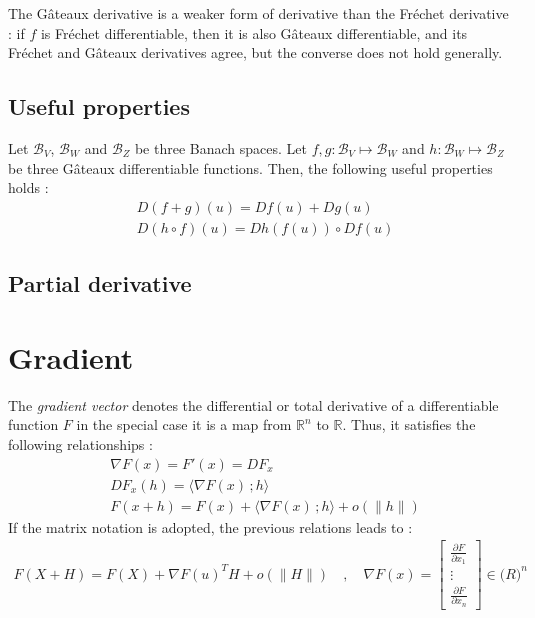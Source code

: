 The Gâteaux derivative is a weaker form of derivative than the Fréchet derivative : if $f$ is Fréchet differentiable, then it is also Gâteaux differentiable, and its Fréchet and Gâteaux derivatives agree, but the converse does not hold generally.

\subsection{Useful properties}

Let $\mathcal{B}_V$, $\mathcal{B}_W$ and $\mathcal{B}_Z$ be three Banach spaces. 
Let $f,g : \mathcal{B}_V \longmapsto \mathcal{B}_W$ and $h : \mathcal{B}_W \longmapsto \mathcal{B}_Z$ be three Gâteaux differentiable functions. Then, the following useful properties holds :
\begin{align}
	&D(f+g)(u) = Df(u) + Dg(u)\\
	&D(h\circ f)(u) = Dh(f(u)) \circ Df(u)
\end{align}

\subsection{Partial derivative}

\section{Gradient}

The \emph{gradient vector} denotes the differential or total derivative of a differentiable function $F$ in the special case it is a map from $\mathbb{R}^n$ to $\mathbb{R}$. Thus, it satisfies the following relationships :
\begin{align}
	&\nabla F(x) = F'(x) = DF_x\\
	&DF_x(h) = \langle \nabla F(x)\,; h\rangle\\
	&F(x + h) = F(x) + \langle \nabla F(x)\,; h\rangle + o(\|h\|)
\end{align}
If the matrix notation is adopted, the previous relations leads to :
\begin{align}
	{F}({X}+{H}) = F(X) +  \nabla F(u)^T H + o(\|H\|)
	\quad , \quad \nabla F(x) = \left[\begin{array}{c}\frac{\partial F}{\partial x_1} \\ \vdots \\ \frac{\partial F}{\partial x_n}\end{array}\right] \in \mathbb(R)^n
\end{align}

